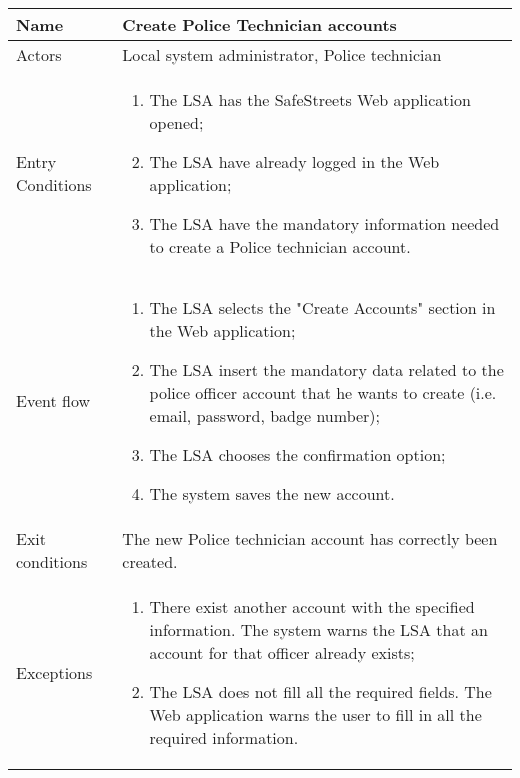 \begin{table}[H]
  \centering
  \begin{tabularx}{\textwidth}{ |l|X| }
    \hline
    Name & Create Police Technician accounts \\
    \hline
    Actors & Local system administrator, Police technician\\
    \hline
    Entry Conditions & \begin{enumerate}[noitemsep]
                        \item The LSA has the SafeStreets Web application opened;
                        \item The LSA have already logged in the Web application;
                        \item The LSA have the mandatory information needed to create a Police technician account.
                      \end{enumerate}\\
    \hline
    Event flow & \begin{enumerate}[noitemsep]
                    \item The LSA selects the "Create Accounts" section in the Web application;
                    \item The LSA insert the mandatory data related to the police officer account that he wants to create (i.e. email, password, badge number);
                    \item The LSA chooses the confirmation option;
                    \item The system saves the new account.
                \end{enumerate}\\
    \hline
    Exit conditions & The new Police technician account has correctly been created.\\ 
    \hline
    Exceptions &  \begin{enumerate}[noitemsep]
                    \item There exist another account with the specified information. The system warns the LSA that an account for that officer already exists;
                    \item The LSA does not fill all the required fields. The Web application warns the user to fill in all the required information.
                  \end{enumerate}\\
    \hline
  \end{tabularx}
\end{table}
